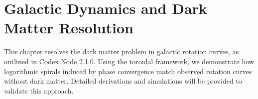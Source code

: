 \section{Galactic Dynamics and Dark Matter Resolution}
This chapter resolves the dark matter problem in galactic rotation curves, as outlined in Codex Node 2.1.0. Using the toroidal framework, we demonstrate how logarithmic spirals induced by phase convergence match observed rotation curves without dark matter. Detailed derivations and simulations will be provided to validate this approach.